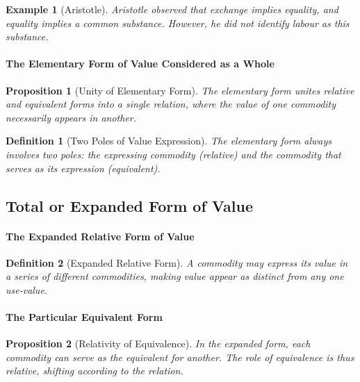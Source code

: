 \documentclass{article}
\newtheorem{innerdef}{Definition}
\newtheorem{innerprop}{Proposition}
\newtheorem{innerex}{Example}
\newenvironment{definition}{\begin{innerdef}}{\end{innerdef}}
\newenvironment{proposition}{\begin{innerprop}}{\end{innerprop}}
\newenvironment{example}{\begin{innerex}}{\end{innerex}}
\begin{document}
\begin{example}[Aristotle]
Aristotle observed that exchange implies equality, and equality implies a common substance.  
However, he did not identify labour as this substance.
\end{example}

\paragraph{The Elementary Form of Value Considered as a Whole} %

\begin{proposition}[Unity of Elementary Form]
The elementary form unites relative and equivalent forms into a single relation, 
where the value of one commodity necessarily appears in another.
\end{proposition}

\begin{definition}[Two Poles of Value Expression]
The elementary form always involves two poles: the expressing commodity (relative) 
and the commodity that serves as its expression (equivalent).
\end{definition}

\subsection{Total or Expanded Form of Value} %

\paragraph{The Expanded Relative Form of Value} %

\begin{definition}[Expanded Relative Form]
A commodity may express its value in a series of different commodities, 
making value appear as distinct from any one use-value.
\end{definition}

\paragraph{The Particular Equivalent Form} %

\begin{proposition}[Relativity of Equivalence]
In the expanded form, each commodity can serve as the equivalent for another.  
The role of equivalence is thus relative, shifting according to the relation.
\end{proposition}
\end{document}
